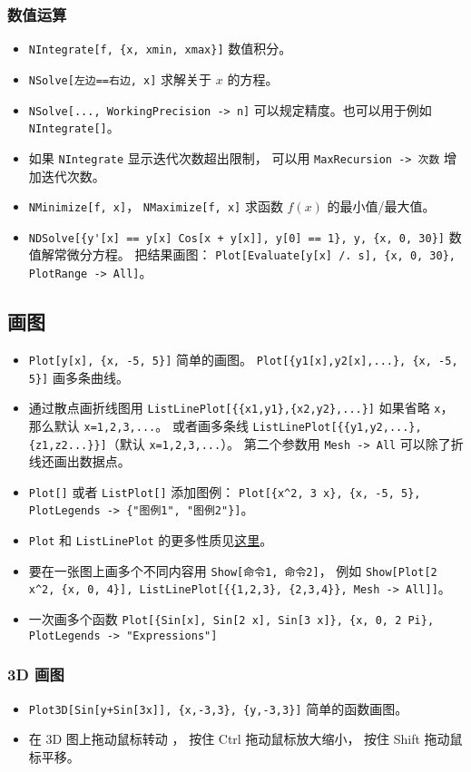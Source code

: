 \subsubsection{数值运算}
\begin{itemize}
\item \verb`NIntegrate[f, {x, xmin, xmax}]` 数值积分。
\item \verb`NSolve[左边==右边, x]` 求解关于 $x$ 的方程。
\item \verb`NSolve[..., WorkingPrecision -> n]` 可以规定精度。也可以用于例如 \verb`NIntegrate[]`。
\item 如果 \verb`NIntegrate` 显示迭代次数超出限制， 可以用 \verb`MaxRecursion -> 次数` 增加迭代次数。
\item \verb`NMinimize[f, x]`， \verb`NMaximize[f, x]` 求函数 $f(x)$ 的最小值/最大值。
\item \verb`NDSolve[{y'[x] == y[x] Cos[x + y[x]], y[0] == 1}, y, {x, 0, 30}]` 数值解常微分方程。 把结果画图： \verb`Plot[Evaluate[y[x] /. s], {x, 0, 30}, PlotRange -> All]`。
\end{itemize}

\subsection{画图}
\begin{itemize}
\item \verb`Plot[y[x], {x, -5, 5}]` 简单的画图。 \verb`Plot[{y1[x],y2[x],...}, {x, -5, 5}]` 画多条曲线。
\item 通过散点画折线图用 \verb`ListLinePlot[{{x1,y1},{x2,y2},...}]` 如果省略 \verb`x`， 那么默认 \verb`x=1,2,3,...`。 或者画多条线 \verb`ListLinePlot[{{y1,y2,...},{z1,z2...}}]`（默认 \verb`x=1,2,3,...`）。 第二个参数用 \verb`Mesh -> All` 可以除了折线还画出数据点。
\item \verb`Plot[]` 或者 \verb`ListPlot[]` 添加图例： \verb`Plot[{x^2, 3 x}, {x, -5, 5}, PlotLegends -> {"图例1", "图例2"}]`。
\item \verb`Plot` 和 \verb`ListLinePlot` 的更多性质见\href{https://reference.wolfram.com/language/ref/Plot.html}{这里}。
\item 要在一张图上画多个不同内容用 \verb`Show[命令1, 命令2]`， 例如 \verb`Show[Plot[2 x^2, {x, 0, 4}], ListLinePlot[{{1,2,3}, {2,3,4}}, Mesh -> All]]`。
\item 一次画多个函数 \verb`Plot[{Sin[x], Sin[2 x], Sin[3 x]}, {x, 0, 2 Pi},  PlotLegends -> "Expressions"]`
\end{itemize}

\subsubsection{3D 画图}
\begin{itemize}
\item \verb`Plot3D[Sin[y+Sin[3x]], {x,-3,3}, {y,-3,3}]` 简单的函数画图。
\item 在 3D 图上拖动鼠标转动 ， 按住 Ctrl 拖动鼠标放大缩小， 按住 Shift 拖动鼠标平移。
\end{itemize}

